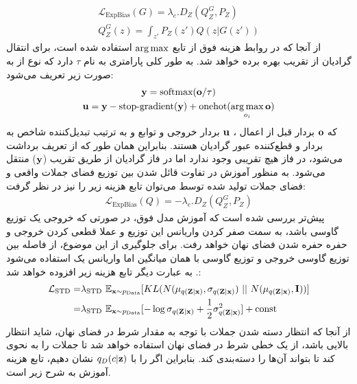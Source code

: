 \begin{gather}
	\mathcal{L}_\text{ExpBias}(G) = \lambda_{e} . D_ Z(Q_Z^G, P_Z)
	\\
	Q_Z^G (z) = \int_{z'} P_Z(z') Q(z|G(z'))
\end{gather}
از آنجا که در روابط هزینه فوق از تابع $\operatorname*{arg\,max}$ استفاده شده است، برای انتقال گرادیان از تقریب  بهره برده خواهد شد.   به طور کلی پارامتری به نام $\tau$ دارد که نوع  از به صورت زیر تعریف می‌شود:
\begin{gather}
	{\bf y} = \text{softmax}({\bf o}/\tau)
	\\
	{\bf u} = {\bf y} - \text{stop-gradient}({\bf y}) + \text{onehot}(\operatorname*{arg\,max}_{o_i} {\bf o})
\end{gather}
که ${\bf o}$ بردار قبل از اعمال 
،
${\bf u}$
بردار خروجی و توابع  و  به ترتیب تبدیل‌کننده شاخص به بردار
و قطع‌کننده عبور گرادیان هستند. بنابراین همان طور که از تعریف برداشت می‌شود، در فاز
هیچ تقریبی وجود ندارد اما در فاز
گرادیان از طریق تقریب 
(${\bf y}$)
منتقل می‌شود.
به منظور آموزش \encoder{} در تفاوت قائل شدن بین توزیع فضای جملات واقعی و فضای جملات تولید شده توسط \decoder{} می‌توان تابع هزینه زیر را نیز در نظر گرفت:
\begin{gather}
	\mathcal{L}_\text{ExpBias}(Q) = -\lambda_{e} . D_ Z(Q_Z^G, P_Z)
\end{gather}
\fi
پیش‌تر بررسی شده است که آموزش مدل فوق، در صورتی که خروجی \encoder{} یک توزیع گاوسی باشد، به سمت صفر کردن واریانس این توزیع و عملا قطعی کردن خروجی \encoder{} و حفره حفره شدن فضای نهان خواهد رفت. برای جلوگیری از این موضوع، از فاصله  بین توزیع گاوسی خروجی \encoder{} و توزیع گاوسی با همان میانگین اما واریانس یک استفاده می‌شود \cite{wasser_text_kl}. به عبارت دیگر تابع هزینه زیر افزوده خواهد شد:
\begin{align}
    {\mathcal{L}}_\text{STD} =& \lambda_\text{STD} ~ \mathbb E_{{\bf x} \sim p_\text{Data}} [
    KL(N({\bf \mu}_{q({\bf Z}|{\bf x})}, {\bf \sigma}_{q({\bf Z}|{\bf x})}) ~ || ~ N({\bf \mu}_{q({\bf Z}|{\bf x})}, {\bf I}) ) ] \nonumber
    \\
    =& \lambda_\text{STD} ~ \mathbb E_{{\bf x} \sim p_\text{Data}} [ 
    -\log {\bf \sigma}_{q({\bf Z}|{\bf x})} + \frac{1}{2} {\bf \sigma}_{q({\bf Z}|{\bf x})}^2 ] + \text{const}
\end{align}
از آنجا که انتظار دسته شدن جملات با توجه به مقدار شرط در فضای نهان، شاید انتظار بالایی باشد، از یک \classifier{} خطی شرط در فضای نهان استفاده خواهد شد تا \encoder{} جملات را به نحوی \encode{} کند تا \classifier{} بتواند آن‌ها را دسته‌بندی کند. بنابراین اگر \classifier{} را با $q_D(c|{\bf z})$ نشان دهیم، تابع هزینه آموزش \classifier{} به شرح زیر است.
